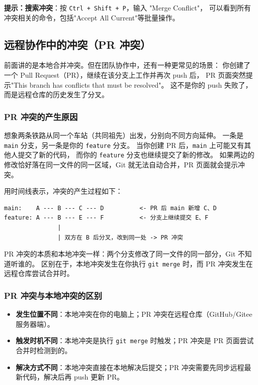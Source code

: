 \documentclass[12pt,a4paper,openany]{ctexbook}
\begin{document}
\noindent\textbf{提示：}\textbf{搜索冲突}：按 \texttt{Ctrl + Shift + P}，输入 "Merge Conflict"，
可以看到所有冲突相关的命令，包括"Accept All Current"等批量操作。

\subsection{远程协作中的冲突（PR 冲突）}

前面讲的是本地合并冲突。但在团队协作中，还有一种更常见的场景：
你创建了一个 Pull Request（PR），继续在该分支上工作并再次 push 后，
PR 页面突然提示"This branch has conflicts that must be resolved"。
这不是你的 push 失败了，而是远程仓库的历史发生了分叉。

\subsubsection{PR 冲突的产生原因}

想象两条铁路从同一个车站（共同祖先）出发，分别向不同方向延伸。
一条是 \texttt{main} 分支，另一条是你的 \texttt{feature} 分支。
当你创建 PR 后，\texttt{main} 上可能又有其他人提交了新的代码，
而你的 \texttt{feature} 分支也继续提交了新的修改。
如果两边的修改恰好落在同一文件的同一区域，Git 就无法自动合并，PR 页面就会提示冲突。

用时间线表示，冲突的产生过程如下：

\begin{verbatim}
main:    A --- B --- C --- D          <- PR 后 main 新增 C、D
feature: A --- B --- E --- F          <- 分支上继续提交 E、F
               |
               | 双方在 B 后分叉，改到同一处 -> PR 冲突
\end{verbatim}

\begin{infobox}
PR 冲突的本质和本地冲突一样：两个分支修改了同一文件的同一部分，Git 不知道听谁的。
区别在于，本地冲突发生在你执行 \texttt{git merge} 时，而 PR 冲突发生在远程仓库尝试合并时。
\end{infobox}

\subsubsection{PR 冲突与本地冲突的区别}

\begin{itemize}[leftmargin=2em]
  \item \textbf{发生位置不同}：本地冲突在你的电脑上；PR 冲突在远程仓库（GitHub/Gitee 服务器端）。
  \item \textbf{触发时机不同}：本地冲突是执行 \texttt{git merge} 时触发；PR 冲突是 PR 页面尝试合并时检测到的。
  \item \textbf{解决方式不同}：本地冲突直接在本地解决后提交；PR 冲突需要先同步远程最新代码，解决后再 push 更新 PR。
\end{itemize}
\end{document}
